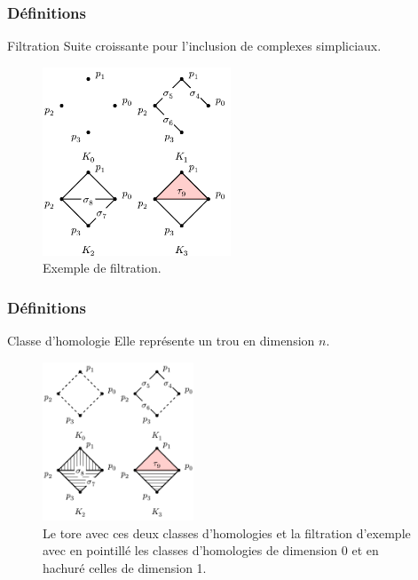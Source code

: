 \documentclass{beamer}
\begin{document}
\begin{frame}
    \frametitle{Définitions}
    \begin{block}{Filtration}
        Suite croissante pour l'inclusion de complexes simpliciaux.
    \end{block}

    \begin{figure}
        \includegraphics[width=0.5\textwidth]{../images/filtration_ex.png}
        \centering
        \caption{Exemple de filtration.}
    \end{figure}
\end{frame}
\begin{frame}
    \frametitle{Définitions}
    \begin{block}{Classe d'homologie}
        Elle représente un trou en dimension $n$.
    \end{block}

    \begin{figure}
        \centering
        \hfill
        \includegraphics[width=0.4\textwidth]{../images/filtrationHomo.png}
        \caption{Le tore avec ces deux classes d'homologies et la filtration d'exemple avec en pointillé les classes d'homologies de dimension 0 et en hachuré celles de dimension 1.}
    \end{figure}
\end{frame}
\end{document}
